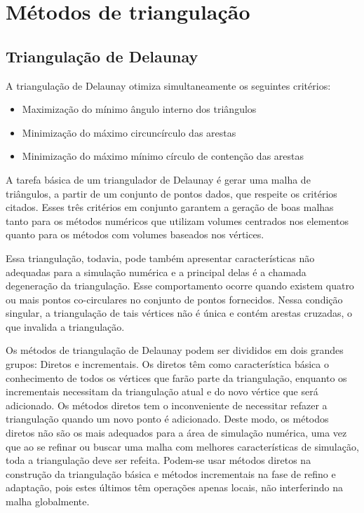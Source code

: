 


\section{Métodos de triangulação}
\subsection{Triangulação de Delaunay}
A triangulação de Delaunay otimiza simultaneamente os seguintes critérios:
\begin{itemize}
    \item Maximização do mínimo ângulo interno dos triângulos
    \item Minimização do máximo circuncírculo das arestas
    \item Minimização do máximo mínimo círculo de contenção das arestas
\end{itemize}

A tarefa básica de um triangulador de Delaunay é gerar uma malha de triângulos, a partir de um conjunto de pontos dados, que respeite os critérios citados. Esses três critérios em conjunto garantem a geração de boas malhas tanto para os métodos numéricos que utilizam volumes centrados nos elementos quanto para os métodos com volumes baseados nos vértices.

Essa triangulação, todavia, pode também apresentar características não adequadas para a simulação numérica e a principal delas é a chamada degeneração da triangulação. Esse comportamento ocorre quando existem quatro ou mais pontos co-circulares no conjunto de pontos fornecidos. Nessa condição singular, a triangulação de tais vértices não é única e contém arestas cruzadas, o que invalida a triangulação.

Os métodos de triangulação de Delaunay podem ser divididos em dois grandes grupos: Diretos e incrementais. Os diretos têm como característica básica o conhecimento de todos os vértices que farão parte da triangulação, enquanto os incrementais necessitam da triangulação atual e do novo vértice que será adicionado. Os métodos diretos tem o inconveniente de necessitar refazer a triangulação quando um novo ponto é adicionado. Deste modo, os métodos diretos não são os mais adequados para a área de simulação numérica, uma vez que ao se refinar ou buscar uma malha com melhores características de simulação, toda a triangulação deve ser refeita. Podem-se usar métodos diretos na construção da triangulação básica e métodos incrementais na fase de refino e adaptação, pois estes últimos têm operações apenas locais, não interferindo na malha globalmente.

